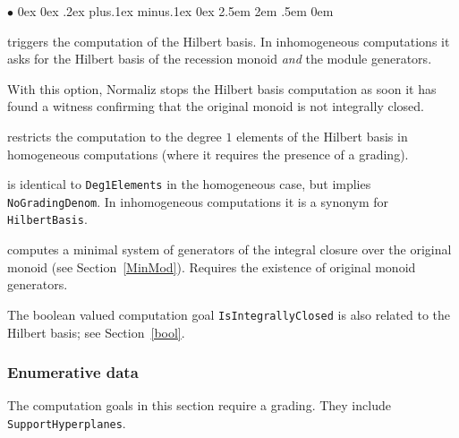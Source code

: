 \documentclass[12pt,a4paper]{scrartcl}
\newcommand{\stdli}{ \topsep0ex \partopsep0ex %
\parsep.2ex plus.1ex minus.1ex \itemsep0ex%
\leftmargin2.5em \labelwidth2em \labelsep.5em \rightmargin0em}%
\renewenvironment{itemize}{\begin{list}{{$\bullet$}}{\stdli}}{\end{list}}
\theoremstyle{definition}
\def\itemtt[#1]{\item[\textbf{\ttt{#1}}]}
\def\ttt{\texttt}
\begin{document}
\begin{itemize}
	
	\itemtt[HilbertBasis, -N] triggers the computation of the Hilbert basis. In inhomogeneous computations it asks for the Hilbert basis of the recession monoid \emph{and} the module generators.
	
	\itemtt [WitnessNotIntegrallyClosed] With this option, Normaliz stops the Hilbert basis computation as soon it has found a witness confirming that the original monoid is not integrally closed.
	
	\itemtt[Deg1Elements, -1] restricts the computation to the degree $1$ elements of the Hilbert basis in homogeneous computations (where it requires the presence of a grading).
	
	\itemtt[LatticePoints] is identical to \verb|Deg1Elements| in the homogeneous case, but implies \verb|NoGradingDenom|. In inhomogeneous computations it is a synonym for \verb|HilbertBasis|.
	
	\itemtt[ModuleGeneratorsOverOriginalMonoid, -M] computes a minimal system of generators of the integral closure over the original monoid (see Section~\ref{MinMod}). Requires the existence of original monoid generators.
\end{itemize}

The boolean valued computation goal \verb|IsIntegrallyClosed| is also related to the Hilbert basis; see Section~\ref{bool}.

\subsubsection{Enumerative data}

The computation goals in this section require a grading. They include \verb|SupportHyperplanes|.
\end{document}
